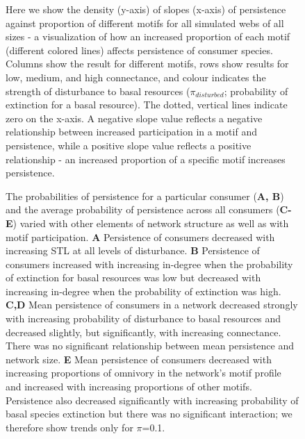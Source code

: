 \documentclass[12pt]{article}
\begin{document}
\begin{spacing}{2.0}
    \begin{figure}[hb!]
    \centering
        \caption{Here we show the density (y-axis) of slopes (x-axis) of persistence against proportion of different motifs for all simulated webs of all sizes - a visualization of how an increased proportion of each motif (different colored lines) affects persistence of consumer species. Columns show the result for different motifs, rows show results for low, medium, and high connectance, and colour indicates the strength of disturbance to basal resources ($\pi_{disturbed}$; probability of extinction for a basal resource). The dotted, vertical lines indicate zero on the x-axis. A negative slope value reflects a negative relationship between increased participation in a motif and persistence, while a positive slope value reflects a positive relationship - an increased proportion of a specific motif increases persistence.}
        \label{fig:density_prop}
    \end{figure}    


    \begin{figure}[ht!]
        \centering
        \caption{The probabilities of persistence for a particular consumer (\textbf{A, B}) and the average probability of persistence across all consumers (\textbf{C-E}) varied with other elements of network structure as well as with motif participation.
        \textbf{A} Persistence of consumers decreased with increasing STL at all levels of disturbance.
        \textbf{B} Persistence of consumers increased with increasing in-degree when the probability of extinction for basal resources was low but decreased with increasing in-degree when the probability of extinction was high.
        \textbf{C,D} Mean persistence of consumers in a network decreased strongly with increasing probability of disturbance to basal resources and decreased slightly, but significantly, with increasing connectance. There was no significant relationship between mean persistence and network size.
        \textbf{E} Mean persistence of consumers decreased with increasing proportions of omnivory in the network's motif profile and increased with increasing proportions of other motifs. Persistence also decreased significantly with increasing probability of basal species extinction but there was no significant interaction; we therefore show trends only for $\pi$=0.1.}
        \label{fig:lm_CS}
    \end{figure}


\end{spacing}
\end{document}
